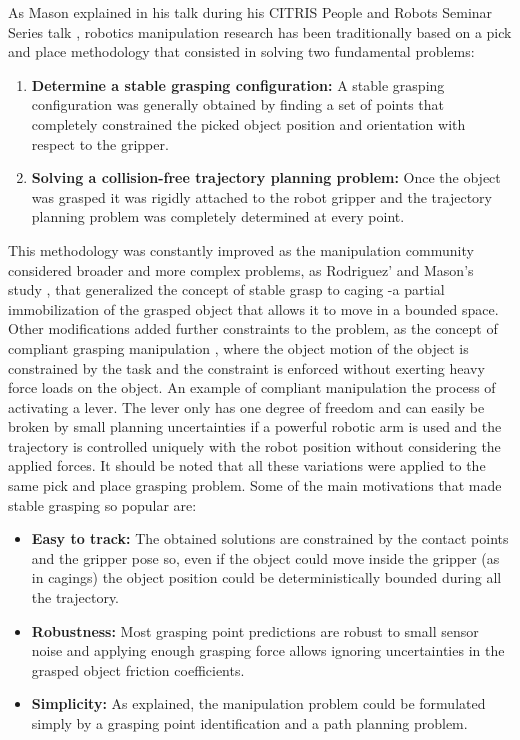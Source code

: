 \documentclass[12,twoside]{TFG-GM}
\theoremstyle{definition}
\theoremstyle{remark}
\begin{document}
As Mason explained in his talk during his CITRIS People and Robots Seminar Series talk \cite{mason_talk}, robotics manipulation research has been traditionally based on a pick and place methodology that consisted in solving two fundamental problems:
\begin{enumerate}
\item{ \textbf{Determine a stable grasping configuration:}} A stable grasping configuration was generally obtained by finding a set of points that completely constrained the picked object position and orientation with respect to the gripper.
\item{ \textbf{Solving a collision-free trajectory planning problem:}} Once the object was grasped it was rigidly attached to the robot gripper and the trajectory planning problem was completely determined at every point.
\end{enumerate}

This methodology was constantly improved as the manipulation community considered broader and more complex problems, as Rodriguez' and Mason's study \cite{caging}, that generalized the concept of stable grasp to caging -a partial immobilization of the grasped object that allows it to move in a bounded space. Other modifications added further constraints to the problem, as the concept of compliant grasping manipulation \cite{compliant_control}, where the object motion of the object is constrained by the task and the constraint is enforced without exerting heavy force loads on the object. An example of compliant manipulation the process of activating a lever. The lever only has one degree of freedom and can easily be broken by small planning uncertainties if a powerful robotic arm is used and the trajectory is controlled uniquely with the robot position without considering the applied forces. It should be noted that all these variations were applied to the same pick and place grasping problem. Some of the main motivations that made stable grasping so popular are:
\begin{itemize}
\item {\textbf{Easy to track:}} The obtained solutions are constrained by the contact points and the gripper pose so, even if the object could move inside the gripper (as in cagings) the object position could be deterministically bounded during all the trajectory.
\item {\textbf{Robustness:}} Most grasping point predictions are robust to small sensor noise and applying enough grasping force allows ignoring uncertainties in the grasped object friction coefficients.
\item {\textbf{Simplicity:}} As explained, the manipulation problem could be formulated simply by a grasping point identification and a path planning problem.
\end{itemize}
\end{document}
